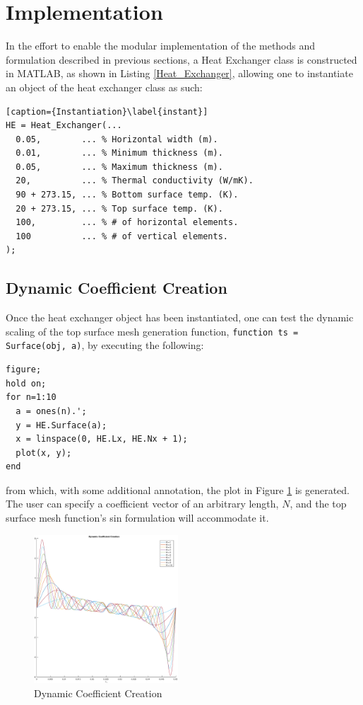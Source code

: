 \documentclass{article}
\begin{document}
\section{Implementation}
In the effort to enable the modular implementation of the methods and formulation described in previous sections, a Heat Exchanger class is constructed in MATLAB, as shown in Listing \ref{Heat_Exchanger}, allowing one to instantiate an object of the heat exchanger class as such:
\begin{lstlisting}[caption={Instantiation}\label{instant}]
HE = Heat_Exchanger(...
  0.05,        ... % Horizontal width (m).
  0.01,        ... % Minimum thickness (m).
  0.05,        ... % Maximum thickness (m).
  20,          ... % Thermal conductivity (W/mK).
  90 + 273.15, ... % Bottom surface temp. (K).
  20 + 273.15, ... % Top surface temp. (K).
  100,         ... % # of horizontal elements.
  100          ... % # of vertical elements.
);
\end{lstlisting}

\subsection{Dynamic Coefficient Creation}
Once the heat exchanger object has been instantiated, one can test the dynamic scaling of the top surface mesh generation function, \lstinline[]{function ts = Surface(obj, a)}, by executing the following:
\begin{lstlisting}[caption={Dynamics Coefficient Creation}]
figure;
hold on;
for n=1:10
  a = ones(n).';
  y = HE.Surface(a);
  x = linspace(0, HE.Lx, HE.Nx + 1);
  plot(x, y);
end
\end{lstlisting}
from which, with some additional annotation, the plot in Figure \ref{fig:dcc} is generated. The user can specify a coefficient vector of an arbitrary length, $N$, and the top surface mesh function's sin formulation will accommodate it.
\begin{figure}[htb]
    \centering
    \includegraphics[width=0.48\textwidth]{Pics/Dynamic_Coefficient_Creation.eps}
    \caption{Dynamic Coefficient Creation}
    \label{fig:dcc}
\end{figure}
\end{document}
